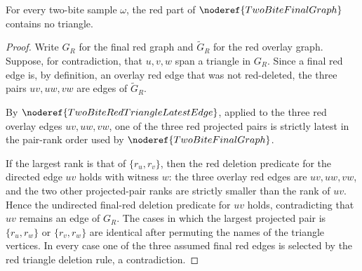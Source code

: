 \begin{helper}
For every two-bite sample \(\omega\), the red part of
\(\noderef{TwoBiteFinalGraph}\) contains no triangle.
\end{helper}
\begin{proof}
Write \(G_R\) for the final red graph and \(\widetilde G_R\) for the red
overlay graph.  Suppose, for contradiction, that \(u,v,w\) span a triangle in
\(G_R\).  Since a final red edge is, by definition, an overlay red edge that was
not red-deleted, the three pairs \(uv,uw,vw\) are edges of \(\widetilde G_R\).

By \(\noderef{TwoBiteRedTriangleLatestEdge}\), applied to the three red overlay
edges \(uv,uw,vw\), one of the three red projected pairs is strictly latest in
the pair-rank order used by \(\noderef{TwoBiteFinalGraph}\).

If the largest rank is that of \(\{r_u,r_v\}\), then the red deletion predicate
for the directed edge \(uv\) holds with witness \(w\): the three overlay red
edges are \(uv,uw,vw\), and the two other projected-pair ranks are strictly
smaller than the rank of \(uv\).  Hence the undirected final-red deletion
predicate for \(uv\) holds, contradicting that \(uv\) remains an edge of
\(G_R\).  The cases in which the largest projected pair is \(\{r_u,r_w\}\) or
\(\{r_v,r_w\}\) are identical after permuting the names of the triangle
vertices.  In every case one of the three assumed final red edges is selected
by the red triangle deletion rule, a contradiction.
\end{proof}
